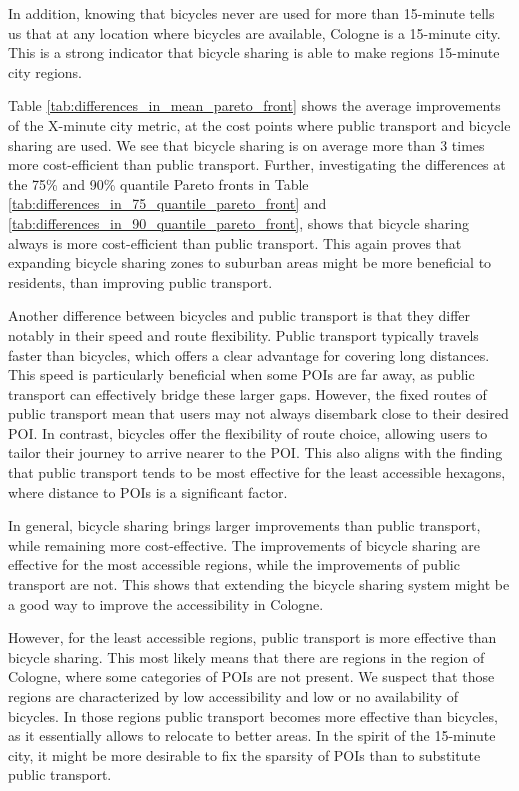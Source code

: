 In addition, knowing that bicycles never are used for more than 15-minute tells us that at any location where bicycles are available, Cologne is a 15-minute city.
This is a strong indicator that bicycle sharing is able to make regions 15-minute city regions.

Table \ref{tab:differences_in_mean_pareto_front} shows the average improvements of the X-minute city metric, at the cost points where public transport and bicycle sharing are used.
We see that bicycle sharing is on average more than 3 times more cost-efficient than public transport.
Further, investigating the differences at the 75\% and 90\% quantile Pareto fronts in Table \ref{tab:differences_in_75_quantile_pareto_front} and \ref{tab:differences_in_90_quantile_pareto_front}, shows that bicycle sharing always is more cost-efficient than public transport.
This again proves that expanding bicycle sharing zones to suburban areas might be more beneficial to residents, than improving public transport.


Another difference between bicycles and public transport is that they differ notably in their speed and route flexibility. 
Public transport typically travels faster than bicycles, which offers a clear advantage for covering long distances. 
This speed is particularly beneficial when some POIs are far away, as public transport can effectively bridge these larger gaps. 
However, the fixed routes of public transport mean that users may not always disembark close to their desired POI. 
In contrast, bicycles offer the flexibility of route choice, allowing users to tailor their journey to arrive nearer to the POI. 
This also aligns with the finding that public transport tends to be most effective for the least accessible hexagons, where distance to POIs is a significant factor.

In general, bicycle sharing brings larger improvements than public transport, while remaining more cost-effective.
The improvements of bicycle sharing are effective for the most accessible regions, while the improvements of public transport are not.
This shows that extending the bicycle sharing system might be a good way to improve the accessibility in Cologne.

However, for the least accessible regions, public transport is more effective than bicycle sharing.
This most likely means that there are regions in the region of Cologne, where some categories of POIs are not present.
We suspect that those regions are characterized by low accessibility and low or no availability of bicycles.
In those regions public transport becomes more effective than bicycles, as it essentially allows to relocate to better areas.
In the spirit of the 15-minute city, it might be more desirable to fix the sparsity of POIs than to substitute public transport.


